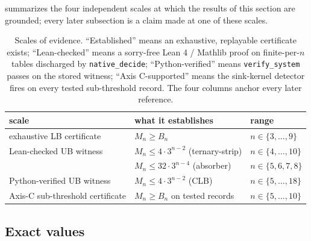 \documentclass[11pt,a4paper]{article}
\theoremstyle{plain}
\theoremstyle{definition}
\newcommand{\Mn}{M_n}
\newcommand{\Bn}{B_n}
\begin{document}
 summarizes the four independent scales at which
the results of this section are grounded; every later subsection is
a claim made at one of these scales.

\begin{table}[ht]
\centering
\caption{Scales of evidence.  ``Established'' means an exhaustive,
replayable certificate exists; ``Lean-checked'' means a sorry-free
Lean 4 / Mathlib proof on finite-per-$n$ tables discharged by
\texttt{native\_decide}; ``Python-verified'' means
\texttt{verify\_system} passes on the stored witness; ``Axis
C-supported'' means the sink-kernel detector fires on every tested
sub-threshold record.  The four columns anchor every later
reference.}\label{tab:scales}
\begin{tabular}{l l l}
\toprule
scale & what it establishes & range\\\midrule
exhaustive LB certificate      & $\Mn \ge \Bn$                   & $n \in \{3, \ldots, 9\}$\\
Lean-checked UB witness        & $\Mn \le 4 \cdot 3^{n-2}$ (ternary-strip) & $n \in \{4, \ldots, 10\}$\\
                               & $\Mn \le 32 \cdot 3^{n-4}$ (absorber)     & $n \in \{5, 6, 7, 8\}$\\
Python-verified UB witness     & $\Mn \le 4 \cdot 3^{n-2}$ (CLB)           & $n \in \{5, \ldots, 18\}$\\
Axis-C sub-threshold certificate & $\Mn \ge \Bn$ on tested records       & $n \in \{5, \ldots, 10\}$\\
\bottomrule
\end{tabular}
\end{table}

\subsection{Exact values}\label{sec:main-exact}
\end{document}
